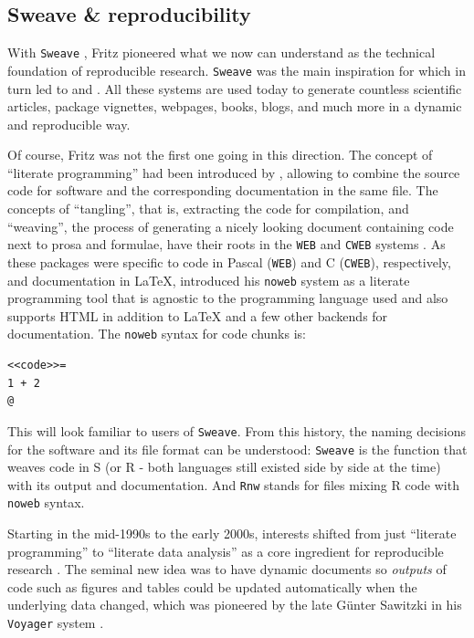 \subsection{Sweave \& reproducibility}\label{sweave-reproducibility}

With \texttt{Sweave} \citep{Leisch:2002}, Fritz pioneered what we now can understand as
the technical foundation of reproducible research. \texttt{Sweave} was the main
inspiration for  \citep{Xie:2015} which in turn led to
 \citep{Xie+Allaire+Grolemund:2018} and 
\citep{Scheidegger+Teague+Dervieux:2024}. All these systems are used today to
generate countless scientific articles, package vignettes, webpages, books, blogs,
and much more in a dynamic and reproducible way.

Of course, Fritz was not the first one going in this direction. The concept
of ``literate programming'' had been introduced by \citet{Knuth:1984}, allowing to
combine the source code for software and the corresponding documentation
in the same file. The concepts of ``tangling'', that is, extracting the code
for compilation, and ``weaving'', the process of generating a nicely looking
document containing code next to prosa and formulae, have their roots in the
\texttt{WEB} and \texttt{CWEB} systems \citep{Knuth+Levy:1993}. As these packages were specific
to code in Pascal (\texttt{WEB}) and C (\texttt{CWEB}), respectively, and documentation in
LaTeX, \citet{Ramsey:1994} introduced his \texttt{noweb} system as a literate programming
tool that is agnostic to the programming language used and also supports HTML
in addition to LaTeX and a few other backends for documentation. The \texttt{noweb}
syntax for code chunks is:

\pagebreak

\begin{verbatim}
<<code>>=
1 + 2
@
\end{verbatim}

This will look familiar to users of \texttt{Sweave}. From this history, the naming
decisions for the software and its file format can be understood: \texttt{Sweave}
is the function that weaves code in S (or R - both languages still existed
side by side at the time) with its output and documentation. And \texttt{Rnw} stands for files
mixing R code with \texttt{noweb} syntax.

Starting in the mid-1990s to the early 2000s, interests shifted from just
``literate programming'' to ``literate data analysis'' \citep{Leisch:2002, Leisch+Rossini:2003}
as a core ingredient for reproducible research \citep{Buckheit+Donoho:1995}.
The seminal new idea was to have dynamic documents so \emph{outputs} of code
such as figures and tables could be updated automatically when the underlying
data changed, which was pioneered by the late Günter Sawitzki in his
\texttt{Voyager} system \citep{Sawitzki:1996}.

